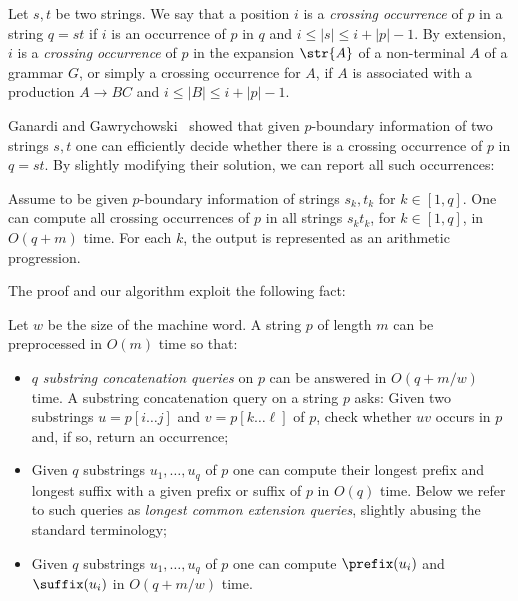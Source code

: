 \begin{definition}
Let $s,t$ be two strings. We say that a position $i$ is a \emph{crossing occurrence} of $p$ in a string $q=st$ if $i$ is an occurrence of $p$ in $q$ and $i \le |s| \le i+|p|-1$. By extension, $i$ is a \emph{crossing occurrence} of $p$ in the expansion $\str{A}$ of a non-terminal $A$ of a grammar $G$, or simply a crossing occurrence for $A$, if $A$ is associated with a production $A\rightarrow BC$ and $i \le |B| \le i+|p|-1$.
\end{definition}

Ganardi and Gawrychowski~\cite{DBLP:conf/soda/GanardiG22} showed that given $p$-boundary information of two strings $s,t$ one can efficiently decide whether there is a crossing occurrence of $p$ in $q = st$. By slightly modifying their solution, we can report all such occurrences: 

\begin{lemma}
\label{lemma:crossing}
Assume to be given $p$-boundary information of strings $s_k, t_k$ for $k \in [1,q]$. One can compute all crossing occurrences of $p$ in all strings $s_k t_k$, for $k\in[1,q]$, in $O(q+m)$ time. For each $k$, the output is represented as an arithmetic progression.
\end{lemma}

The proof and our algorithm exploit the following fact:

\begin{fact}
\label{fact:substring_concat}
Let $w$ be the size of the machine word. A string $p$ of length $m$ can be preprocessed in $O(m)$ time so that:
\begin{itemize}
\item $q$ \emph{substring concatenation queries} on $p$ can be answered in $O(q+m/w)$ time. A substring concatenation query on a string $p$ asks: Given two substrings $u = p[i\dots j]$ and $v = p[k \dots \ell]$ of $p$, check whether $uv$ occurs in $p$ and, if so, return an occurrence; 
\item Given $q$ substrings $u_1,\ldots,u_q$ of $p$ one can compute their longest prefix and longest suffix with a given prefix or suffix of $p$ in $O(q)$ time. Below we refer to such queries as \emph{longest common extension queries}, slightly abusing the standard terminology;
\item Given $q$ substrings $u_1,\ldots,u_q$ of $p$ one can compute $\prefix(u_i)$ and $\suffix(u_i)$ in $O(q+m/w)$ time.
\end{itemize}
\end{fact} 

